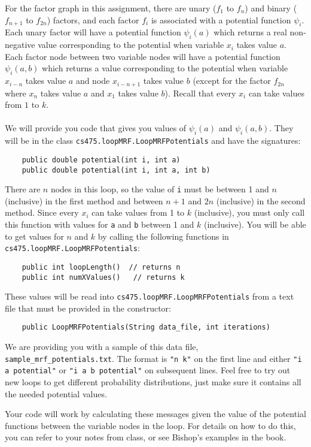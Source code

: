 \documentclass[11pt]{article}
\newcommand{\code}[1]{{\footnotesize \tt #1}}
\begin{document}
For the factor graph in this assignment, there are unary ($f_1$ to $f_n$) and binary ($f_{n+1}$ to $f_{2n}$) factors, and each factor $f_i$ is associated with a potential function $\psi_i$.
Each unary factor will have a potential function $\psi_{i}(a)$ which returns a real non-negative value corresponding to the potential when variable $x_{i}$ takes value $a$. Each factor node between two variable nodes will have a potential function $\psi_{i}(a, b)$ which returns a value corresponding to the potential when variable $x_{i-n}$ takes value $a$ and node $x_{i-n+1}$ takes value $b$ (except for the factor $f_{2n}$ where $x_n$ takes value $a$ and $x_1$ takes value $b$). Recall that every $x_i$ can take values from $1$ to $k$.\\
\\
We will provide you code that gives you values of $\psi_i(a)$ and $\psi_i(a, b)$. They will be in the class \code{cs475.loopMRF.LoopMRFPotentials} and have the signatures:
\begin{verbatim}
    public double potential(int i, int a)
    public double potential(int i, int a, int b)
\end{verbatim}
There are $n$ nodes in this loop, so the value of \code{i} must be between 1 and $n$ (inclusive) in the first method and between $n+1$ and $2n$ (inclusive) in the second method. Since every $x_i$ can take values from 1 to $k$ (inclusive), you must only call this function with values for \code{a} and \code{b} between 1 and $k$ (inclusive). You will be able to get values for $n$ and $k$ by calling the following functions in \code{cs475.loopMRF.LoopMRFPotentials}:
\begin{verbatim}
    public int loopLength()  // returns n
    public int numXValues()   // returns k
\end{verbatim}
These values will be read into \code{cs475.loopMRF.LoopMRFPotentials} from a text file that must be provided in the constructor:
\begin{verbatim}
    public LoopMRFPotentials(String data_file, int iterations)
\end{verbatim}
We are providing you with a sample of this data file, \code{sample\_mrf\_potentials.txt}. The format is \code{"n k"} on the first line and either \code{"i a potential"} or \code{"i a b potential"} on subsequent lines. Feel free to try out new loops to get different probability distributions, just make sure it contains all the needed potential values.

Your code will work by calculating these messages given the value of the potential functions between the variable nodes in the loop. For details on how to do this, you can refer to your notes from class, or see Bishop's examples in the book.
\end{document}
